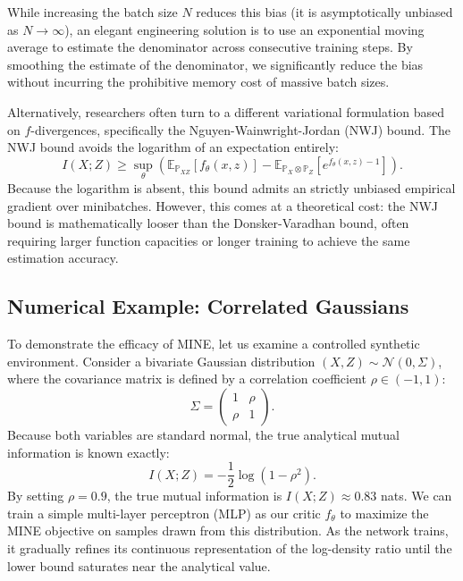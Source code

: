 While increasing the batch size $N$ reduces this bias (it is asymptotically unbiased as $N \to \infty$), an elegant engineering solution is to use an exponential moving average to estimate the denominator across consecutive training steps. By smoothing the estimate of the denominator, we significantly reduce the bias without incurring the prohibitive memory cost of massive batch sizes.

Alternatively, researchers often turn to a different variational formulation based on $f$-divergences, specifically the Nguyen-Wainwright-Jordan (NWJ) bound. The NWJ bound avoids the logarithm of an expectation entirely:
\begin{equation}
    I(X; Z) \geq \sup_{\theta} \left( \mathbb{E}_{\mathbb{P}_{XZ}}[f_\theta(x,z)] - \mathbb{E}_{\mathbb{P}_X \otimes \mathbb{P}_Z}\left[e^{f_\theta(x,z) - 1}\right] \right).
\end{equation}
Because the logarithm is absent, this bound admits an strictly unbiased empirical gradient over minibatches. However, this comes at a theoretical cost: the NWJ bound is mathematically looser than the Donsker-Varadhan bound, often requiring larger function capacities or longer training to achieve the same estimation accuracy.

\subsection{Numerical Example: Correlated Gaussians}

To demonstrate the efficacy of MINE, let us examine a controlled synthetic environment. Consider a bivariate Gaussian distribution $(X, Z) \sim \mathcal{N}(0, \Sigma)$, where the covariance matrix is defined by a correlation coefficient $\rho \in (-1, 1)$:
\begin{equation}
    \Sigma = \begin{pmatrix} 1 & \rho \\ \rho & 1 \end{pmatrix}.
\end{equation}
Because both variables are standard normal, the true analytical mutual information is known exactly:
\begin{equation}
    I(X; Z) = -\frac{1}{2} \log (1 - \rho^2).
\end{equation}
By setting $\rho = 0.9$, the true mutual information is $I(X; Z) \approx 0.83$ nats. We can train a simple multi-layer perceptron (MLP) as our critic $f_\theta$ to maximize the MINE objective on samples drawn from this distribution. As the network trains, it gradually refines its continuous representation of the log-density ratio until the lower bound saturates near the analytical value.

